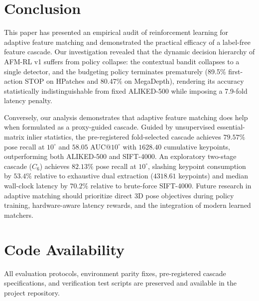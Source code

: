 \documentclass[conference]{IEEEtran}
\begin{document}
\section{Conclusion}
\label{sec:conclusion}

This paper has presented an empirical audit of reinforcement learning for adaptive feature matching and demonstrated the practical efficacy of a label-free feature cascade. Our investigation revealed that the dynamic decision hierarchy of AFM-RL v1 suffers from policy collapse: the contextual bandit collapses to a single detector, and the budgeting policy terminates prematurely (89.5\% first-action STOP on HPatches and 80.47\% on MegaDepth), rendering its accuracy statistically indistinguishable from fixed ALIKED-500 while imposing a 7.9-fold latency penalty.

Conversely, our analysis demonstrates that adaptive feature matching does help when formulated as a proxy-guided cascade. Guided by unsupervised essential-matrix inlier statistics, the pre-registered fold-selected cascade achieves $79.57\%$ pose recall at $10^\circ$ and $58.05$ AUC@$10^\circ$ with $1628.40$ cumulative keypoints, outperforming both ALIKED-500 and SIFT-4000. An exploratory two-stage cascade ($C_6$) achieves $82.13\%$ pose recall at $10^\circ$, slashing keypoint consumption by $53.4\%$ relative to exhaustive dual extraction ($4318.61$ keypoints) and median wall-clock latency by $70.2\%$ relative to brute-force SIFT-4000. Future research in adaptive matching should prioritize direct 3D pose objectives during policy training, hardware-aware latency rewards, and the integration of modern learned matchers.

\section*{Code Availability}
All evaluation protocols, environment parity fixes, pre-registered cascade specifications, and verification test scripts are preserved and available in the project repository.
\end{document}
